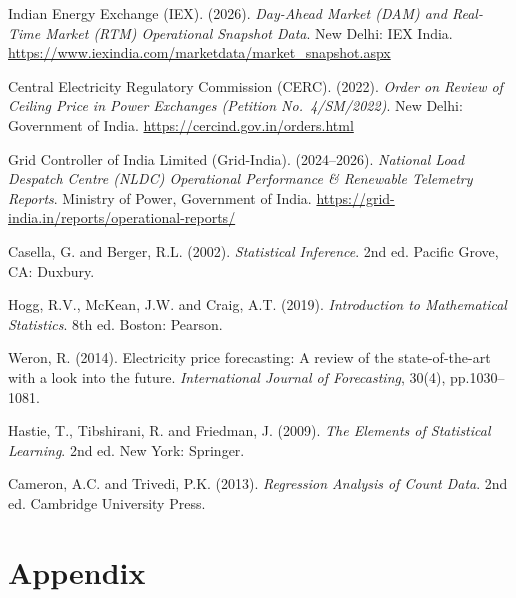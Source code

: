 \documentclass[12pt, a4paper]{article}
\theoremstyle{definition}
\begin{document}
\begin{enumerate}[label={[\arabic*]}, leftmargin=1.5cm]
    \item Indian Energy Exchange (IEX). (2026). \textit{Day-Ahead Market (DAM) and Real-Time Market (RTM) Operational Snapshot Data}. New Delhi: IEX India. \url{https://www.iexindia.com/marketdata/market_snapshot.aspx}

    \item Central Electricity Regulatory Commission (CERC). (2022). \textit{Order on Review of Ceiling Price in Power Exchanges (Petition No.\ 4/SM/2022)}. New Delhi: Government of India. \url{https://cercind.gov.in/orders.html}

    \item Grid Controller of India Limited (Grid-India). (2024--2026). \textit{National Load Despatch Centre (NLDC) Operational Performance \& Renewable Telemetry Reports}. Ministry of Power, Government of India. \url{https://grid-india.in/reports/operational-reports/}

    \item Casella, G. and Berger, R.L. (2002). \textit{Statistical Inference}. 2nd ed. Pacific Grove, CA: Duxbury.

    \item Hogg, R.V., McKean, J.W. and Craig, A.T. (2019). \textit{Introduction to Mathematical Statistics}. 8th ed. Boston: Pearson.

    \item Weron, R. (2014). Electricity price forecasting: A review of the state-of-the-art with a look into the future. \textit{International Journal of Forecasting}, 30(4), pp.1030--1081.

    \item Hastie, T., Tibshirani, R. and Friedman, J. (2009). \textit{The Elements of Statistical Learning}. 2nd ed. New York: Springer.

    \item Cameron, A.C. and Trivedi, P.K. (2013). \textit{Regression Analysis of Count Data}. 2nd ed. Cambridge University Press.
\end{enumerate}

\newpage
\section*{Appendix}
\end{document}
